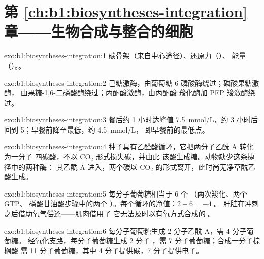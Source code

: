 \section*{第 \ref{ch:b1:biosyntheses-integration} 章——生物合成与整合的细胞}

\begin{solution}{exo:b1:biosyntheses-integration:1}
碳骨架（来自中心途径）、还原力（）、
能量（）。。
\end{solution}

\begin{solution}{exo:b1:biosyntheses-integration:2}
己糖激酶，由葡萄糖-6-磷酸酶绕过；磷酸果糖激酶，
由果糖-1,6-二磷酸酶绕过；丙酮酸激酶，由丙酮酸
羧化酶加 PEP 羧激酶绕过。
\end{solution}

\begin{solution}{exo:b1:biosyntheses-integration:3}
餐后约 1 小时达峰值 \qty{7.5}{mmol/L}，约 3 小时后回到
\qty{5}{}；早餐前降至最低，约 \qty{4.5}{mmol/L}，
即早餐前的最低点。
\end{solution}

\begin{solution}{exo:b1:biosyntheses-integration:4}
种子具有乙醛酸循环，它把两分子乙酰 A 转化为一分子
四碳酸，不以 $\mathrm{CO_2}$ 形式损失碳，并由此
该酸生成糖。动物缺少这条捷径中的两种酶：
其乙酰 A 进入，两个碳以
$\mathrm{CO_2}$ 的形式离开，此时尚无净草酰乙酸生成。
\end{solution}

\begin{solution}{exo:b1:biosyntheses-integration:5}
每分子葡萄糖相当于 6 个 （两次羧化、两个 GTP、
磷酸甘油酸步骤中的两个 ）。每个循环的净值：$2 - 6 = -4$ 。
肝脏在冲刺之后借助氧气偿还——肌肉借用了
它无法及时以有氧方式合成的 。
\end{solution}

\begin{solution}{exo:b1:biosyntheses-integration:6}
每分子葡萄糖生成 2 分子乙酰 A，需 4 分子葡萄糖。
经氧化支路，每分子葡萄糖生成 2 分子 ，需 7 分子葡萄糖；合成一分子棕榈酸
需 11 分子葡萄糖，其中 4 分子提供碳，7 分子提供电子。
\end{solution}

